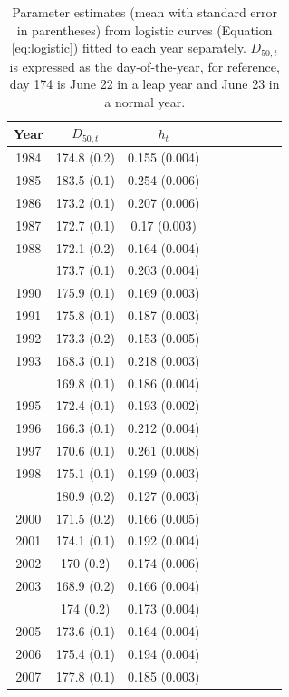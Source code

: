 \documentclass[12pt,]{book}
\theoremstyle{definition}
\theoremstyle{definition}
\theoremstyle{definition}
\theoremstyle{remark}
\begin{document}
\clearpage

\begin{singlespace}

\begin{table}

\caption{\label{tab:rt-ests-table}Parameter estimates (mean with standard error in parentheses) from
      logistic curves (Equation \ref{eq:logistic}) fitted to each year separately. $D_{50,t}$ is expressed
      as the day-of-the-year, for reference, day 174 is June 22 in a leap year and June 23 in a normal year.}
\centering
\begin{tabular}[t]{ccccccccc}
\toprule
Year & $D_{50,t}$ & $h_t$\\
\midrule
1984 & 174.8 (0.2) & 0.155 (0.004)\\
1985 & 183.5 (0.1) & 0.254 (0.006)\\
1986 & 173.2 (0.1) & 0.207 (0.006)\\
1987 & 172.7 (0.1) & 0.17 (0.003)\\
1988 & 172.1 (0.2) & 0.164 (0.004)\\
\addlinespace
1989 & 173.7 (0.1) & 0.203 (0.004)\\
1990 & 175.9 (0.1) & 0.169 (0.003)\\
1991 & 175.8 (0.1) & 0.187 (0.003)\\
1992 & 173.3 (0.2) & 0.153 (0.005)\\
1993 & 168.3 (0.1) & 0.218 (0.003)\\
\addlinespace
1994 & 169.8 (0.1) & 0.186 (0.004)\\
1995 & 172.4 (0.1) & 0.193 (0.002)\\
1996 & 166.3 (0.1) & 0.212 (0.004)\\
1997 & 170.6 (0.1) & 0.261 (0.008)\\
1998 & 175.1 (0.1) & 0.199 (0.003)\\
\addlinespace
1999 & 180.9 (0.2) & 0.127 (0.003)\\
2000 & 171.5 (0.2) & 0.166 (0.005)\\
2001 & 174.1 (0.1) & 0.192 (0.004)\\
2002 & 170 (0.2) & 0.174 (0.006)\\
2003 & 168.9 (0.2) & 0.166 (0.004)\\
\addlinespace
2004 & 174 (0.2) & 0.173 (0.004)\\
2005 & 173.6 (0.1) & 0.164 (0.004)\\
2006 & 175.4 (0.1) & 0.194 (0.004)\\
2007 & 177.8 (0.1) & 0.185 (0.003)\\

\end{tabular}
\end{table}
\end{singlespace}
\end{document}
